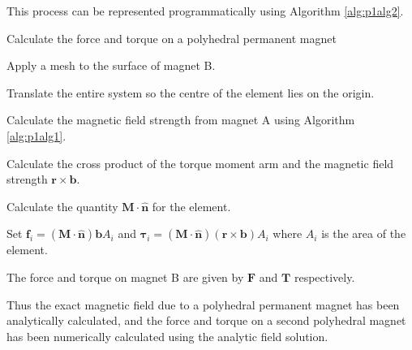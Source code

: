 This process can be represented programmatically using Algorithm \ref{alg:p1alg2}.
\begin{algorithm}
	\caption{Calculate the force and torque on a polyhedral permanent magnet}
	\begin{algorithmic}[1]
		\State Apply a mesh to the surface of magnet B.
		\State \parbox[t]{\dimexpr\linewidth-\leftmargin-\labelsep-\labelwidth}{Translate the entire system so the centre of the element lies on the origin.}\newline
		\State \parbox[t]{\dimexpr\linewidth-\leftmargin-\labelsep-\labelwidth}{Calculate the magnetic field strength from magnet A using Algorithm \ref{alg:p1alg1}.}\newline
		\State \parbox[t]{\dimexpr\linewidth-\leftmargin-\labelsep-\labelwidth}{Calculate the cross product of the torque moment arm and the magnetic field strength \(\mathbf{r}\times\mathbf{b}\).}\newline
		\State Calculate the quantity \(\mathbf{M}\cdot\hat{\mathbf{n}}\) for the element.
		\State \parbox[t]{\dimexpr\linewidth-\leftmargin-\labelsep-\labelwidth+4mm}{Set \(\mathbf{f}_i=\left(\mathbf{M}\cdot\hat{\mathbf{n}}\right)\mathbf{b}A_i\) and \(\mathbf{\tau}_i=\left(\mathbf{M}\cdot\hat{\mathbf{n}}\right)\left(\mathbf{r}\times\mathbf{b}\right)A_i\) where \(A_i\) is the area of the element.}\newline
		\EndFor
		\State The force and torque on magnet B are given by \(\mathbf{F}\) and \(\mathbf{T}\) respectively.
	\end{algorithmic}\label{alg:p1alg2}
\end{algorithm}

Thus the exact magnetic field due to a polyhedral permanent magnet has been analytically calculated, and the force and torque on a second polyhedral magnet has been numerically calculated using the analytic field solution.